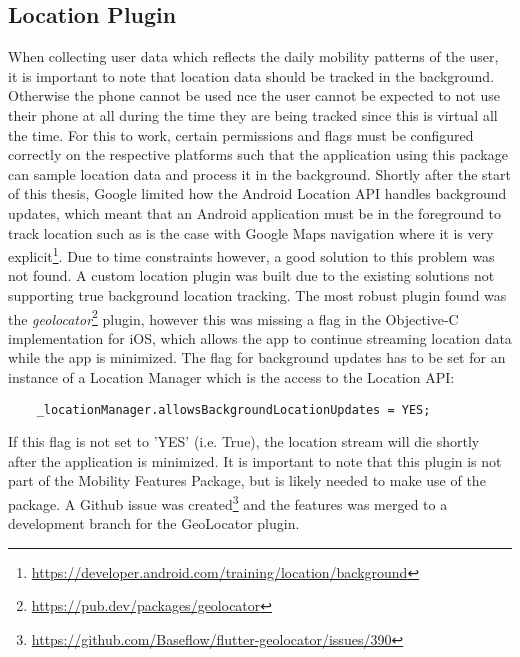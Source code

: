 \subsection{Location Plugin}
When collecting user data which reflects the daily mobility patterns of the user, it is important to note that location data should be tracked in the background. Otherwise the phone cannot be used nce the user cannot be expected to not use their phone at all during the time they are being tracked since this is virtual all the time. For this to work, certain permissions and flags must be configured correctly on the respective platforms such that the application using this package can sample location data and process it in the background. Shortly after the start of this thesis, Google limited how the Android Location API handles background updates, which meant that an Android application must be in the foreground to track location such as is the case with Google Maps navigation where it is very explicit\footnote{\url{https://developer.android.com/training/location/background}}. Due to time constraints however, a good solution to this problem was not found. A custom location plugin was built due to the existing solutions not supporting true background location tracking. The most robust plugin found was the \textit{geolocator}\footnote{\url{https://pub.dev/packages/geolocator}} plugin, however this was missing a flag in the Objective-C implementation for iOS, which allows the app to continue streaming location data while the app is minimized. The flag for background updates has to be set for an instance of a Location Manager which is the access to the Location API:

\begin{verbatim}
    _locationManager.allowsBackgroundLocationUpdates = YES;
\end{verbatim}

If this flag is not set to 'YES' (i.e. True), the location stream will die shortly after the application is minimized. It is important to note that this plugin is not part of the Mobility Features Package, but is likely needed to make use of the package. A Github issue was created\footnote{\url{https://github.com/Baseflow/flutter-geolocator/issues/390}} and the features was merged to a development branch for the GeoLocator plugin.
